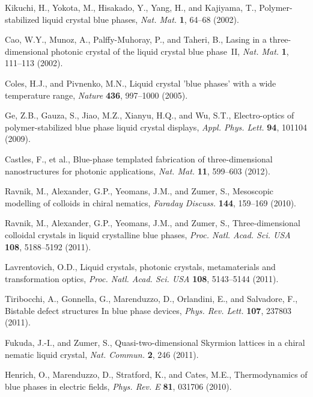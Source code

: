 \documentclass[12pt]{article}
\begin{document}
\begin{thebibliography}{99}
Kikuchi, H., Yokota, M., Hisakado, Y., Yang, H., and Kajiyama, T.,
Polymer-stabilized liquid crystal blue phases,
{\it Nat. Mat.} {\bf 1}, 64--68 (2002).

Cao, W.Y., Munoz, A., Palffy-Muhoray, P., and  Taheri, B.,
Lasing in a three-dimensional photonic crystal of the liquid crystal blue 
phase~II,
{\it Nat. Mat.} {\bf 1}, 111--113 (2002).

Coles, H.J., and  Pivnenko, M.N.,
Liquid crystal 'blue phases' with a wide temperature range,
{\it Nature} {\bf 436}, 997--1000 (2005).

Ge, Z.B., Gauza, S., Jiao, M.Z., Xianyu, H.Q., and  Wu, S.T.,
 Electro-optics of polymer-stabilized blue phase liquid crystal displays,
{\it Appl. Phys. Lett.} {\bf 94}, 101104 (2009).

Castles, F., et al.,
Blue-phase templated fabrication of three-dimensional nanostructures for
photonic applications, {\it Nat. Mat.} {\bf 11}, 599--603 (2012).

Ravnik, M., Alexander, G.P., Yeomans, J.M., and Zumer, S.,
Mesoscopic modelling of colloids in chiral nematics,
{\it Faraday Discuss.} {\bf 144}, 159--169 (2010).

Ravnik, M., Alexander, G.P.,  Yeomans, J.M., and  Zumer, S.,
Three-dimensional colloidal crystals in liquid crystalline 
blue phases, {\it Proc. Natl. Acad. Sci. USA} {\bf 108}, 5188--5192 (2011).

 Lavrentovich, O.D.,
 Liquid crystals, photonic crystals, metamaterials and transformation optics, 
{\it Proc. Natl. Acad. Sci. USA} {\bf 108}, 5143--5144 (2011).

Tiribocchi, A., Gonnella, G., Marenduzzo, D., Orlandini, E., and Salvadore, F.,
Bistable defect structures In blue phase devices,
 {\it Phys. Rev. Lett.} {\bf 107}, 237803 (2011).

Fukuda, J.-I., and Zumer, S.,
Quasi-two-dimensional Skyrmion lattices in a chiral nematic liquid crystal,
{\it Nat. Commun.} {\bf 2}, 246 (2011).

Henrich, O., Marenduzzo, D., Stratford, K., and  Cates, M.E.,
Thermodynamics of blue phases in electric fields,
{\it Phys. Rev. E} {\bf 81}, 031706 (2010).


\end{thebibliography}
\end{document}

